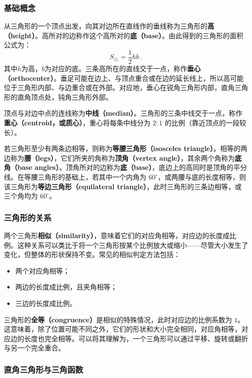 \subsubsection{基础概念}

从三角形的一个顶点出发，向其对边所在直线作的垂线称为三角形的\textbf{高（height）}。高所对的边称作这个高所对的\textbf{底（base）}。由此得到的三角形的面积公式为：
\begin{equation}
S_\triangle=\frac{1}{2} hb~.
\end{equation}
其中$h$为高，$b$为对应的底。三条高所在的直线交于一点，称作\textbf{垂心（orthocenter）}。垂足可能在边上、与顶点重合或在边的延长线上，所以高可能位于三角形内部、与边重合或在外部。对应地，垂心在锐角三角形内部，直角三角形的直角顶点处，钝角三角形外部。

顶点与对边中点的连线称为\textbf{中线（median）}。三角形的三条中线交于一点，称作\textbf{重心（centroid，或质心）}，重心将每条中线分为 $2:1$ 的比例（靠近顶点的一段较长）。

若三角形至少有两条边相等，则称为\textbf{等腰三角形（isosceles triangle）}。相等的两边称为\textbf{腰（legs）}，它们所夹的角称为\textbf{顶角（vertex angle）}，其余两个角称为\textbf{底角（base angles）}。顶角所对的边称为\textbf{底（base）}，底边上的高同时是顶角的平分线。在等腰三角形的基础上，若其中一个内角为 $60^\circ$，或两腰与底的长度相等，则该三角形为\textbf{等边三角形（equilateral triangle）}，此时三角形的三条边相等，或三个角均为 $60^\circ$。

\subsubsection{三角形的关系}

两个三角形\textbf{相似（similarity）}，意味着它们的对应角相等，对应边的长度成比例。这种关系可以类比于将一个三角形按某个比例放大或缩小——尽管大小发生了变化，但整体的形状保持不变。常见的相似判定方法包括：
\begin{itemize}
\item 两个对应角相等；
\item 两边的长度成比例，且夹角相等；
\item 三边的长度成比例。
\end{itemize}

三角形的\textbf{全等（congruence）}是相似的特殊情况，此时对应边的比例系数为 $1$。这意味着，除了位置可能不同之外，它们的形状和大小完全相同，对应角相等，对应边的长度也完全相等。可以将其理解为，一个三角形可以通过平移、旋转或翻折与另一个完全重合。

\subsubsection{直角三角形与三角函数}

